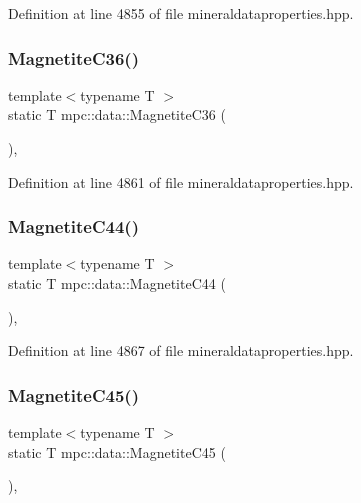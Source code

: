 Definition at line 4855 of file mineraldataproperties.\+hpp.

\mbox{\label{namespacempc_1_1data_ab5da80a81289bc8688ca42aad786234d}} 
\subsubsection{\texorpdfstring{Magnetite\+C36()}{MagnetiteC36()}}
{\footnotesize\ttfamily template$<$typename T $>$ \\
static T mpc\+::data\+::\+Magnetite\+C36 (\begin{DoxyParamCaption}{ }\end{DoxyParamCaption})\hspace{0.3cm}{\ttfamily [inline]}, {\ttfamily [static]}}



Definition at line 4861 of file mineraldataproperties.\+hpp.

\mbox{\label{namespacempc_1_1data_a28c00f4a5b7354d38e8f17bb30fd8389}} 
\subsubsection{\texorpdfstring{Magnetite\+C44()}{MagnetiteC44()}}
{\footnotesize\ttfamily template$<$typename T $>$ \\
static T mpc\+::data\+::\+Magnetite\+C44 (\begin{DoxyParamCaption}{ }\end{DoxyParamCaption})\hspace{0.3cm}{\ttfamily [inline]}, {\ttfamily [static]}}



Definition at line 4867 of file mineraldataproperties.\+hpp.

\mbox{\label{namespacempc_1_1data_a6531a620dafbf43a3c2f185eb5e46aec}} 
\subsubsection{\texorpdfstring{Magnetite\+C45()}{MagnetiteC45()}}
{\footnotesize\ttfamily template$<$typename T $>$ \\
static T mpc\+::data\+::\+Magnetite\+C45 (\begin{DoxyParamCaption}{ }\end{DoxyParamCaption})\hspace{0.3cm}{\ttfamily [inline]}, {\ttfamily [static]}}



